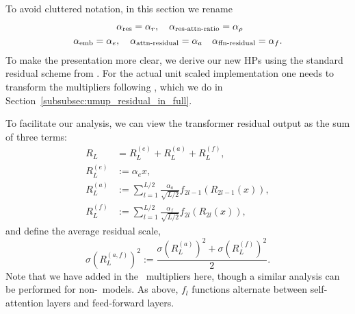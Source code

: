 
To avoid cluttered notation, in this section we rename
\begin{align*}
    &\alpha_{\mathrm{res}} = \alpha_r, \quad
    \alpha_{\mathrm{res{\text -}attn{\text -}ratio}} = \alpha_\rho\\
    \alpha_{\mathrm{emb}} = \alpha_e&, \quad
    \alpha_{\mathrm{attn{\text -}residual}} = \alpha_a \quad
    \alpha_{\mathrm{ffn{\text -}residual}} = \alpha_f.
\end{align*}
To make the presentation more clear, we derive our new HPs using the standard residual scheme from . For the actual unit scaled implementation one needs to transform the multipliers following , which we do in Section~\ref{subsubsec:umup_residual_in_full}.


To facilitate our analysis, we can view the transformer residual output as the sum of three terms:
\begin{align*}
    R_L &= R_L^{(e)} + R_L^{(a)} + R_L^{(f)},
    \\
    R_L^{(e)} &:= \alpha_e x,
    \\
    R_L^{(a)} &:= \sum_{l=1}^{L/2} \frac{\alpha_a}{\sqrt{L/2}} f_{2l-1}(R_{2l-1}(x)),
    \\
    R_L^{(f)} &:= \sum_{l=1}^{L/2} \frac{\alpha_f}{\sqrt{L/2}} f_{2l}(R_{2l}(x)),
\end{align*}
and define the average residual scale,
\begin{equation*}
    \sigma(R_L^{(a,f)})^2 := \frac{\sigma(R_L^{(a)})^2 + \sigma(R_L^{(f)})^2}{2}.
\end{equation*}
Note that we have added in the \depthmup\ multipliers here, though a similar analysis can be performed for non-\depthmup\ models. As above, $f_l$ functions alternate between self-attention layers and feed-forward layers.

